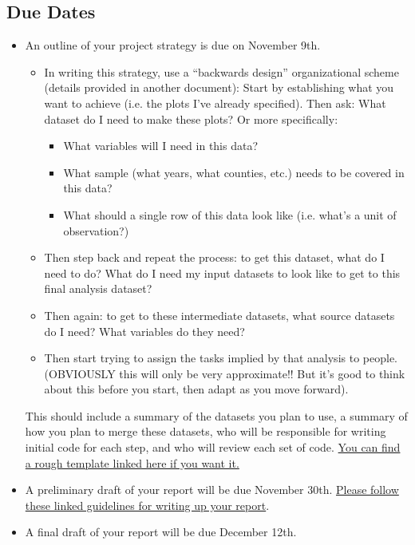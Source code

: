 \documentclass[12pt]{article}
\begin{document}
\subsection*{Due Dates}
\begin{itemize}
  \item An outline of your project strategy is due on November 9th.
  \begin{itemize}
    \item In writing this strategy, use a ``backwards design'' organizational scheme (details provided in another document): Start by establishing what you want to achieve (i.e. the plots I've already specified). Then ask: What dataset do I need to make these plots? Or more specifically:
    \begin{itemize}
      \item What variables will I need in this data?
      \item What sample (what years, what counties, etc.) needs to be covered in this data?
      \item What should a single row of this data look like (i.e. what's a unit of observation?)
    \end{itemize}
    \item Then step back and repeat the process: to get this dataset, what do I need to do? What do I need my input datasets to look like to get to this final analysis dataset?
    \item Then again: to get to these intermediate datasets, what source datasets do I need? What variables do they need?
    \item Then start trying to assign the tasks implied by that analysis to people. (OBVIOUSLY this will only be very approximate!! But it's good to think about this before you start, then adapt as you move forward).
  \end{itemize}
  This should include a summary of the datasets you plan to use, a summary of how you plan to merge these datasets, who will be responsible for writing initial code for each step, and who will review each set of code. \href{https://github.com/nickeubank/practicaldatascience_book/blob/main/ids720_specific/opioids/PracticalDataScience_BackwardsDesignTemplate.pdf}{You can find a rough template linked here if you want it.}
  \item A preliminary draft of your report will be due November 30th. \href{https://ds4humans.com/40_in_practice/27_data_science_memos.html}{Please follow these linked guidelines for writing up your report}.
  \item A final draft of your report will be due December 12th.
\end{itemize}
\end{document}

